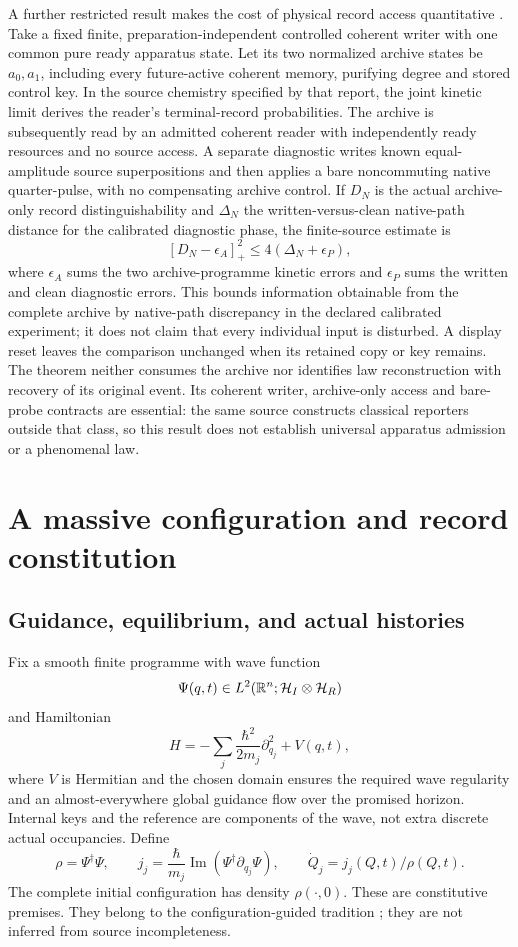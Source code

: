 A further restricted result makes the cost of physical record access quantitative \cite[Section~8]{ShadowEventLawRound003}. Take a fixed finite, preparation-independent controlled coherent writer with one common pure ready apparatus state. Let its two normalized archive states be $a_0,a_1$, including every future-active coherent memory, purifying degree and stored control key. In the source chemistry specified by that report, the joint kinetic limit derives the reader's terminal-record probabilities. The archive is subsequently read by an admitted coherent reader with independently ready resources and no source access. A separate diagnostic writes known equal-amplitude source superpositions and then applies a bare noncommuting native quarter-pulse, with no compensating archive control. If $D_N$ is the actual archive-only record distinguishability and $\Delta_N$ the written-versus-clean native-path distance for the calibrated diagnostic phase, the finite-source estimate is
\[
[D_N-\epsilon_A]_+^2\le4(\Delta_N+\epsilon_P),
\]
where $\epsilon_A$ sums the two archive-programme kinetic errors and $\epsilon_P$ sums the written and clean diagnostic errors. This bounds information obtainable from the complete archive by native-path discrepancy in the declared calibrated experiment; it does not claim that every individual input is disturbed. A display reset leaves the comparison unchanged when its retained copy or key remains. The theorem neither consumes the archive nor identifies law reconstruction with recovery of its original event. Its coherent writer, archive-only access and bare-probe contracts are essential: the same source constructs classical reporters outside that class, so this result does not establish universal apparatus admission or a phenomenal law.

\chapter{A massive configuration and record constitution}\label{ch:massive}
\section{Guidance, equilibrium, and actual histories}\label{section:massive:guidance-equilibrium-and-actual-histories}
Fix a smooth finite programme with wave function
\[
\Psi(q,t)\in L^2(\mathbb R^n;\mathcal H_I\otimes\mathcal H_R)
\]
and Hamiltonian
\[
H=-\sum_j\frac{\hbar^2}{2m_j}\partial_{q_j}^2+V(q,t),
\]
where $V$ is Hermitian and the chosen domain ensures the required wave regularity and an almost-everywhere global guidance flow over the promised horizon. Internal keys and the reference are components of the wave, not extra discrete actual occupancies. Define
\[
\rho=\Psi^\dagger\Psi,\qquad
j_j=\frac{\hbar}{m_j}\operatorname{Im}(\Psi^\dagger\partial_{q_j}\Psi),
\qquad \dot Q_j=j_j(Q,t)/\rho(Q,t).
\]
The complete initial configuration has density $\rho(\cdot,0)$. These are constitutive premises. They belong to the configuration-guided tradition \cite{Bohm1952,Durr1992}; they are not inferred from source incompleteness.

